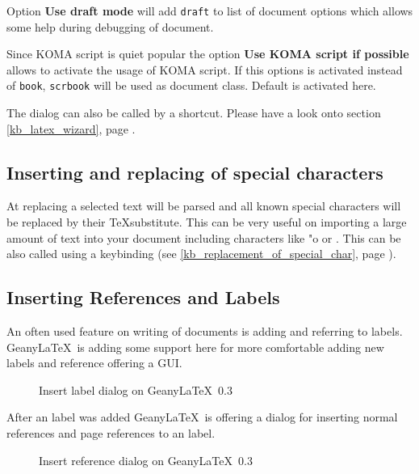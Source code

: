 \documentclass[%
a4paper,%
10pt,%
oneside,%
DIV18,
headsepline,
plainheadsepline,
footsepline,
plainfootsepline,
bibtotoc,%
liststotoc,%
BCOR12mm,%
halfparskip,%
openany,%
]{scrartcl}
\begin{document}
Option \textbf{Use draft mode} will add \texttt{draft} to list of
document options which allows some help during debugging of document.

Since KOMA script is quiet popular the option \textbf{Use KOMA script
if possible} allows to activate the usage of KOMA script. If this
options is activated instead of \texttt{book}, \texttt{scrbook} will
be used as document class. Default is activated here.

The dialog can also be called by a shortcut. Please have a look onto
section \ref{kb_latex_wizard}, page \pageref{kb_latex_wizard}.


\subsection{Inserting and replacing of special characters}
At replacing a selected text will be parsed and all known special
characters will be replaced by their \TeX substitute. This can be very
useful on importing a large amount of text into your document
including characters like "o or \frqq. This can be also called using a
keybinding (see \ref{kb_replacement_of_special_char}, page
\pageref{kb_replacement_of_special_char}).


\subsection{Inserting References and Labels}
An often used feature on writing of documents is adding and referring
to labels. Geany\LaTeX\ is adding some support here for more
comfortable adding new labels and reference offering a GUI.

\begin{figure}[h!]
	\caption{Insert label dialog on Geany\LaTeX\ 0.3}
\end{figure}

After an label was added Geany\LaTeX\ is offering a dialog for
inserting normal references and page references to an label.

\begin{figure}[h!]
	\caption{Insert reference dialog on Geany\LaTeX\ 0.3}
\end{figure}
\end{document}
